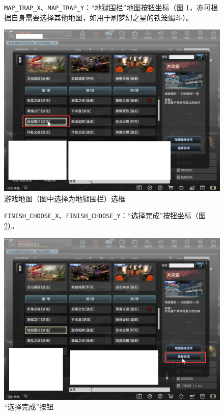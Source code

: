 \begin{figure}[H]
    \Centering
    \parbox[l]{\textwidth}{\lstinline{MAP_TRAP_X}、\lstinline{MAP_TRAP_Y}：“地狱围栏”地图按钮坐标（图 \ref{ch2fig-map-trap}，亦可根据自身需要选择其他地图，如用于刷梦幻之星的铁笼蝎斗）。}
    \includegraphics[width=\textwidth]{docs/assets/map_trap.png}
    \caption{游戏地图（图中选择为地狱围栏）选框}
    \label{ch2fig-map-trap}
\end{figure}
\clearpage

\begin{figure}[H]
    \Centering
    \parbox[l]{\textwidth}{\lstinline{FINISH_CHOOSE_X}、\lstinline{FINISH_CHOOSE_Y}：“选择完成”按钮坐标（图 \ref{ch2fig-finish-choose}）。}
    \includegraphics[width=\textwidth]{docs/assets/finish_choose.png}
    \caption{“选择完成”按钮}
    \label{ch2fig-finish-choose}
\end{figure}
\clearpage

